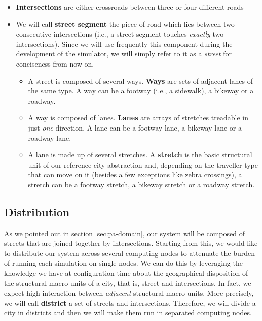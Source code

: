 \begin{itemize}
  \item \textbf{Intersections} are either crossroads between three or four
    different roads
  \item We will call \textbf{street segment} the piece of road which lies
    between two consecutive intersections (i.e., a street segment touches
    \textit{exactly} two intersections). Since we will use frequently this
    component during the development of the simulator, we will simply refer to
    it as a \textit{street} for conciseness from now on.
    \begin{itemize}
      \item A street is composed of several ways. \textbf{Ways} are sets of
        adjacent lanes of the same type. A way can be a footway (i.e., a
        sidewalk), a bikeway or a roadway.
      \item A way is composed of lanes. \textbf{Lanes} are arrays of stretches
        treadable in just \textit{one} direction. A lane can be a footway lane,
        a bikeway lane or a roadway lane.
      \item A lane is made up of several stretches. A \textbf{stretch} is the
        basic structural unit of our reference city abstraction and, depending
        on the traveller type that can move on it (besides a few exceptions
        like zebra crossings), a stretch can be a footway stretch, a bikeway
        stretch or a roadway stretch.
    \end{itemize}
\end{itemize}


\subsection{Distribution}\label{sec:pa-distribution}
As we pointed out in section \ref{sec:pa-domain}, our system will be composed
of streets that are joined together by intersections.
Starting from this, we would like to distribute our system across several
computing nodes to attenuate the burden of running each simulation on single
nodes. We can do this by leveraging the knowledge we have at configuration time
about the geographical disposition of the structural macro-units of a city,
that is, street and intersections. In fact, we expect high interaction between
\textit{adjacent} structural macro-units.
More precisely, we will call \textbf{district} a set of streets and
intersections. Therefore, we will divide a city in districts and then we will
make them run in separated computing nodes.

